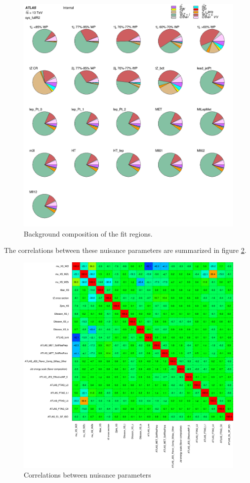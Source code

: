 \documentclass[NOTE, atlasdraft=true, texlive=2016, UKenglish]{\ATLASLATEXPATH atlasdoc}
\begin{document}
\begin{figure}[H]
    \centering
    \includegraphics[width=0.7\linewidth]{all_b/PieChart_postFit.png}
    \caption{Background composition of the fit regions.}
    \label{fig:pie_chart}
\end{figure}

The correlations between these nuisance parameters are summarized in figure \ref{fig:corr_mat}. 

\begin{figure}[H]
    \centering
    \includegraphics[width=1.0\linewidth]{all_b/CorrMatrix.png}
    \caption{Correlations between nuisance parameters}
    \label{fig:corr_mat}
\end{figure}
\end{document}
